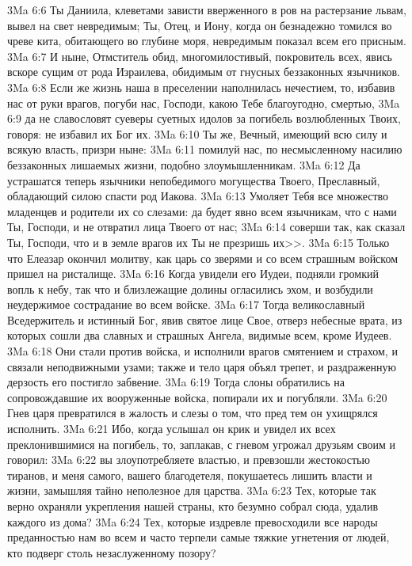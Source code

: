 \vs 3Ma 6:6 Ты Даниила, клеветами зависти вверженного в ров на растерзание львам, вывел на свет невредимым; Ты, Отец, и Иону, когда он безнадежно томился во чреве кита, обитающего во глубине моря, невредимым показал всем его присным.
\vs 3Ma 6:7 И ныне, Отмститель обид, многомилостивый, покровитель всех, явись вскоре сущим от рода Израилева, обидимым от гнусных беззаконных язычников.
\vs 3Ma 6:8 Если же жизнь наша в преселении наполнилась нечестием, то, избавив нас от руки врагов, погуби нас, Господи, какою Тебе благоугодно, смертью,
\vs 3Ma 6:9 да не славословят суеверы суетных идолов за погибель возлюбленных Твоих, говоря: не избавил их Бог их.
\vs 3Ma 6:10 Ты же, Вечный, имеющий всю силу и всякую власть, призри ныне:
\vs 3Ma 6:11 помилуй нас, по несмысленному насилию беззаконных лишаемых жизни, подобно злоумышленникам.
\vs 3Ma 6:12 Да устрашатся теперь язычники непобедимого могущества Твоего, Преславный, обладающий силою спасти род Иакова.
\vs 3Ma 6:13 Умоляет Тебя все множество младенцев и родители их со слезами: да будет явно всем язычникам, что с нами Ты, Господи, и не отвратил лица Твоего от нас;
\vs 3Ma 6:14 соверши так, как сказал Ты, Господи, что и в земле врагов их Ты не презришь их>>.
\rsbpar\vs 3Ma 6:15 Только что Елеазар окончил молитву, как царь со зверями и со всем страшным войском пришел на ристалище.
\vs 3Ma 6:16 Когда увидели его Иудеи, подняли громкий вопль к небу, так что и близлежащие долины огласились эхом, и возбудили неудержимое сострадание во всем войске.
\vs 3Ma 6:17 Тогда великославный Вседержитель и истинный Бог, явив святое лице Свое, отверз небесные врата, из которых сошли два славных и страшных Ангела, видимые всем, кроме Иудеев.
\vs 3Ma 6:18 Они стали против войска, и исполнили врагов смятением и страхом, и связали неподвижными узами; также и тело царя объял трепет, и раздраженную дерзость его постигло забвение.
\vs 3Ma 6:19 Тогда слоны обратились на сопровождавшие их вооруженные войска, попирали их и погубляли.
\vs 3Ma 6:20 Гнев царя превратился в жалость и слезы о том, что пред тем он ухищрялся исполнить.
\vs 3Ma 6:21 Ибо, когда услышал он крик  и увидел их всех преклонившимися на погибель, то, заплакав, с гневом угрожал друзьям своим и говорил:
\vs 3Ma 6:22 вы злоупотребляете властью, и превзошли жестокостью тиранов, и меня самого, вашего благодетеля, покушаетесь лишить власти и жизни, замышляя тайно неполезное для царства.
\vs 3Ma 6:23 Тех, которые так верно охраняли укрепления нашей страны, кто безумно собрал сюда, удалив каждого из дома?
\vs 3Ma 6:24 Тех, которые издревле превосходили все народы преданностью нам во всем и часто терпели самые тяжкие угнетения от людей, кто подверг столь незаслуженному позору?
